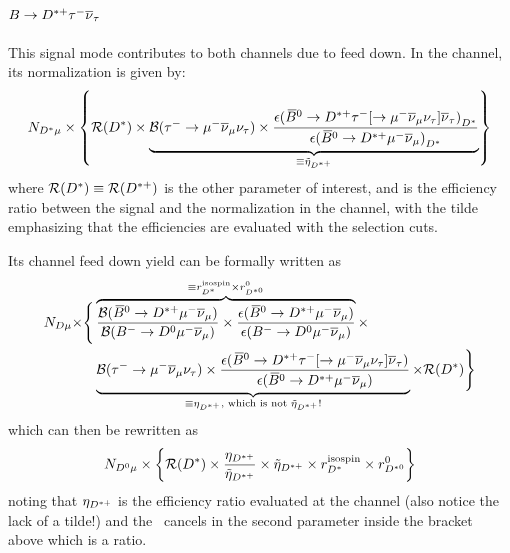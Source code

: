 %
\paragraph{$B \rightarrow {\ensuremath{{D}^{*+}}}{\ensuremath{\tau^-}}{\ensuremath{{\overline{\nu}}_\tau}}$}
This signal mode contributes to both channels due to feed down.
In the \Dstar channel, its normalization is given by:
\begin{equation}
    \fitNmu \times \left\{
        \RDst \times \underbrace{
            \BRTauToMu \times \frac{
                \epsilon{(\Bzb \rightarrow \Dstarp \taum [\rightarrow \mun\neumb\neut] \neutb)}_{\Dstar}
            }{
                \epsilon{(\Bzb \rightarrow \Dstarp \mun\neumb)}_{\Dstar}
            }
        }_{\equiv \fitRDstEff}
    \right\}
\end{equation}
where $\mathcal{R}(D^{*}) \equiv \mathcal{R}(D^{*+})$ is the other parameter of interest,
and \fitRDstEff is the efficiency ratio between the signal and the normalization
in the \Dstar channel,
with the tilde emphasizing that the efficiencies are evaluated with the
\Dstarp\muon selection cuts.

Its \Dz channel feed down yield can be formally written as
\begin{align}
    \fitNDmu \times & \Bigg\{
        \overbrace{
            \frac{
                \mathcal{B}(\Bzb \rightarrow \Dstarp \mun\neumb)
            }{
                \mathcal{B}(\Bm \rightarrow \Dz \mun\neumb)
            } \times \frac{
                \epsilon(\Bzb \rightarrow \Dstarp \mun\neumb)
            }{
                \epsilon(\Bm \rightarrow \Dz \mun\neumb)
        }}^{\equiv \fitDstISO \times \fitnormfd} \times
    \nonumber \\
        & \hphantom{\Bigg\{} \underbrace{\BRTauToMu \times \frac{
            \epsilon(\Bzb \rightarrow \Dstarp \taum [\rightarrow \mun\neumb\neut] \neutb)
        }{
            \epsilon(\Bzb \rightarrow \Dstarp \mun\neumb)
        }}_{\equiv \eta_{\Dstarp}\text{, which is not \fitRDstEff!}}
        \times \RDst \Bigg\}
\end{align}
which can then be rewritten as
\begin{equation}
    N_{{{D}^0}{\mu}} \times \left\{
        \mathcal{R}(D^{*}) \times \frac{\eta_{{{D}^{*+}}}}{\tilde{\eta}_{{{D}^{*+}}}} \times \tilde{\eta}_{{{D}^{*+}}} \times r_{{{D}^*}}^\text{isospin} \times r_{{{D}^{*0}}}^{0}
    \right\}
\end{equation}
noting that $\eta_{{{D}^{*+}}}$ is the efficiency ratio evaluated at the \Dz
channel (also notice the lack of a tilde!) and the \BRTauToMu\ cancels in the
second parameter inside the bracket above which is a ratio.

